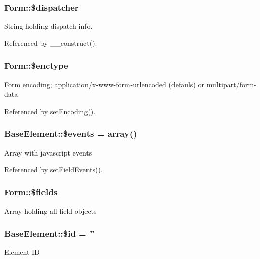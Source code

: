 \subsubsection[{\$dispatcher}]{\setlength{\rightskip}{0pt plus 5cm}Form::\$dispatcher}\label{classForm_ab02292e715af1dc9b0499dd20900aa92}
String holding dispatch info. 

Referenced by \_\-\_\-construct().

\subsubsection[{\$enctype}]{\setlength{\rightskip}{0pt plus 5cm}Form::\$enctype}\label{classForm_a9c23b3ec186995d3df3ad6d4d5efc134}
\hyperlink{classForm}{Form} encoding; application/x-\/www-\/form-\/urlencoded (defauls) or multipart/form-\/data 

Referenced by setEncoding().

\subsubsection[{\$events}]{\setlength{\rightskip}{0pt plus 5cm}BaseElement::\$events = array()}\label{classBaseElement_a02cebe45d277b4ff8f29db08bad371ba}
Array with javascript events 

Referenced by setFieldEvents().

\subsubsection[{\$fields}]{\setlength{\rightskip}{0pt plus 5cm}Form::\$fields}\label{classForm_abcb1c4022c2b93073a00ae65f3269d5b}
Array holding all field objects 
\subsubsection[{\$id}]{\setlength{\rightskip}{0pt plus 5cm}BaseElement::\$id = ''}\label{classBaseElement_a11b6989c43b53869a09f5ce65aa55b45}
Element ID 
